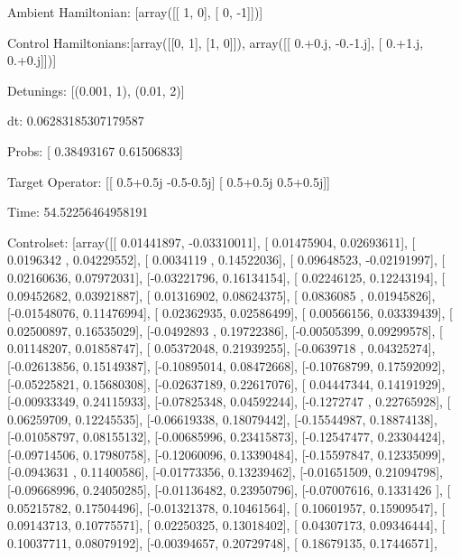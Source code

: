\documentclass{article}
\begin{document}
    

\newpage

Ambient Hamiltonian: [array([[ 1,  0],
       [ 0, -1]])]

Control Hamiltonians:[array([[0, 1],
       [1, 0]]), array([[ 0.+0.j, -0.-1.j],
       [ 0.+1.j,  0.+0.j]])]

Detunings: [(0.001, 1), (0.01, 2)]

 dt: 0.06283185307179587

Probs: [ 0.38493167  0.61506833]

Target Operator: [[ 0.5+0.5j -0.5-0.5j]
 [ 0.5+0.5j  0.5+0.5j]]

Time: 54.52256464958191

Controlset: [array([[ 0.01441897, -0.03310011],
       [ 0.01475904,  0.02693611],
       [ 0.0196342 ,  0.04229552],
       [ 0.0034119 ,  0.14522036],
       [ 0.09648523, -0.02191997],
       [ 0.02160636,  0.07972031],
       [-0.03221796,  0.16134154],
       [ 0.02246125,  0.12243194],
       [ 0.09452682,  0.03921887],
       [ 0.01316902,  0.08624375],
       [ 0.0836085 ,  0.01945826],
       [-0.01548076,  0.11476994],
       [ 0.02362935,  0.02586499],
       [ 0.00566156,  0.03339439],
       [ 0.02500897,  0.16535029],
       [-0.0492893 ,  0.19722386],
       [-0.00505399,  0.09299578],
       [ 0.01148207,  0.01858747],
       [ 0.05372048,  0.21939255],
       [-0.0639718 ,  0.04325274],
       [-0.02613856,  0.15149387],
       [-0.10895014,  0.08472668],
       [-0.10768799,  0.17592092],
       [-0.05225821,  0.15680308],
       [-0.02637189,  0.22617076],
       [ 0.04447344,  0.14191929],
       [-0.00933349,  0.24115933],
       [-0.07825348,  0.04592244],
       [-0.1272747 ,  0.22765928],
       [ 0.06259709,  0.12245535],
       [-0.06619338,  0.18079442],
       [-0.15544987,  0.18874138],
       [-0.01058797,  0.08155132],
       [-0.00685996,  0.23415873],
       [-0.12547477,  0.23304424],
       [-0.09714506,  0.17980758],
       [-0.12060096,  0.13390484],
       [-0.15597847,  0.12335099],
       [-0.0943631 ,  0.11400586],
       [-0.01773356,  0.13239462],
       [-0.01651509,  0.21094798],
       [-0.09668996,  0.24050285],
       [-0.01136482,  0.23950796],
       [-0.07007616,  0.1331426 ],
       [ 0.05215782,  0.17504496],
       [-0.01321378,  0.10461564],
       [ 0.10601957,  0.15909547],
       [ 0.09143713,  0.10775571],
       [ 0.02250325,  0.13018402],
       [ 0.04307173,  0.09346444],
       [ 0.10037711,  0.08079192],
       [-0.00394657,  0.20729748],
       [ 0.18679135,  0.17446571],
\end{document}
